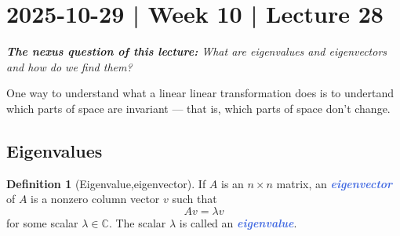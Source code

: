 \documentclass[10pt]{article}
\newcommand{\demph}[1]{\textcolor{RoyalBlue}{\textbf{\slshape #1}}} %
\theoremstyle{definition}
\newtheorem{definition}[theorem]{Definition}
\newcommand{\C}{\mathbb{C}}           %
\begin{document}
\newpage
\section{2025-10-29 | Week 10 | Lecture 28}
\begin{center}
  \begin{tcolorbox}[width=0.9\textwidth, colback=white, colframe=black]
    \textit{\textbf{The nexus question of this lecture:} What are eigenvalues
      and eigenvectors and how do we find them?}
  \end{tcolorbox}
\end{center}

One way to understand what a linear linear transformation does is to undertand
which parts of space are invariant --- that is, which parts of space don't
change. 

\subsection{Eigenvalues}


\begin{definition}[Eigenvalue,eigenvector]
  \label{def:eigenvalue-eigenvector}
  If $A$ is an $n\times n$ matrix, an \demph{eigenvector} of $A$ is a nonzero
  column vector $v$ such that
  \begin{equation*}
    Av=\lambda v
  \end{equation*}
  for some scalar $\lambda\in \C$. The scalar $\lambda$ is called an \demph{eigenvalue}.
\end{definition}
\end{document}
